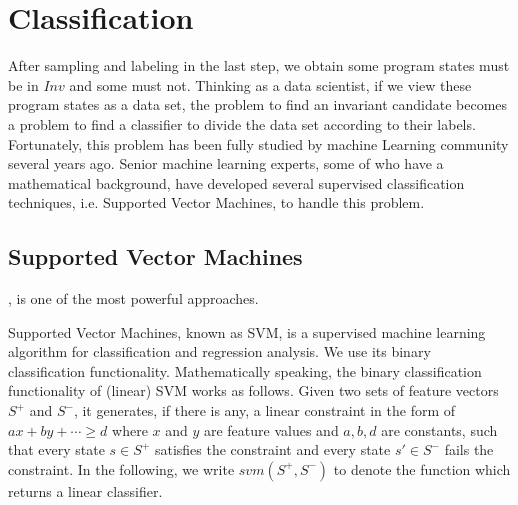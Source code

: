 
\section{Classification} %
\label{sec:classification}

After sampling and labeling in the last step, we obtain some program states must be in $Inv$ and some must not. 
Thinking as a data scientist, if we view these program states as a data set, 
the problem to find an invariant candidate becomes a problem to find a classifier to divide the data set according to their labels.
Fortunately, this problem has been fully studied by machine Learning community several years ago.
Senior machine learning experts, some of who have a mathematical background, 
have developed several supervised classification techniques, i.e. Supported Vector Machines, to handle this problem.



\subsection{Supported Vector Machines}
, is one of the most powerful approaches.

Supported Vector Machines, known as SVM, is a supervised machine learning algorithm for classification and regression analysis. 
We use its binary classification functionality. 
Mathematically speaking, the binary classification functionality of (linear) SVM works as follows. 
Given two sets of feature vectors $S^+$ and $S^-$, it generates, if there is any, 
a linear constraint in the form of $ax + by + \cdots \geq d$ where $x$ and $y$ are feature values and $a, b, d$ are constants, 
such that every state $s \in S^+$ satisfies the constraint and every state $s' \in S^-$ fails the constraint. 
In the following, we write $svm(S^+, S^-)$ to denote the function which returns a linear classifier.

